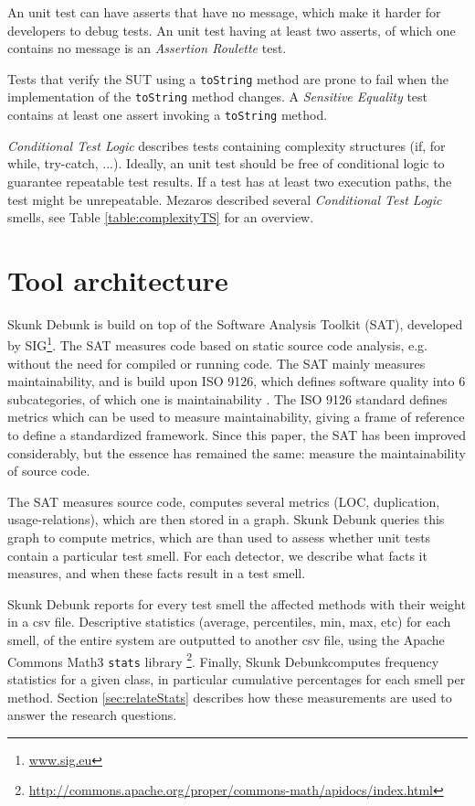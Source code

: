 \documentclass{uvamscse}
\newcommand{\toolName}{Skunk Debunk}
\newcommand{\AtestxUnit}{Mezaros}
\begin{document}
An unit test can have asserts that have no message, which make it harder for developers to debug tests. An unit test having at least two asserts, of which one contains no message is an \emph{Assertion Roulette} test.

Tests that verify the SUT using a \texttt{toString} method are prone to fail when the implementation of the \texttt{toString} method changes. A \emph{Sensitive Equality} test contains at least one assert invoking a \texttt{toString} method.

\emph{Conditional Test Logic} describes tests containing complexity structures (if, for while, try-catch, ...). Ideally, an unit test should be free of conditional logic to guarantee repeatable test results. If a test has at least two execution paths, the test might be unrepeatable. \AtestxUnit{} described several \emph{Conditional Test Logic} smells, see Table \ref{table:complexityTS} for an overview. 

\section{Tool architecture}
\toolName{} is build on top of the Software Analysis Toolkit (SAT), developed by SIG\footnote{\url{www.sig.eu}}. The SAT measures code based on static source code analysis, e.g. without the need for compiled or running code. The SAT mainly measures maintainability, and is build upon ISO 9126, which defines software quality into 6 subcategories, of which one is maintainability \cite{heitlager2007practical}. The ISO 9126 standard defines metrics which can be used to measure maintainability, giving a frame of reference to define a standardized framework. Since this paper, the SAT has been improved considerably, but the essence has remained the same: measure the maintainability of source code. 

The SAT measures source code, computes several metrics (LOC, duplication, usage-relations), which are then stored in a graph. \toolName{} queries this graph to compute metrics, which are than used to assess whether unit tests contain a particular test smell. For each detector, we describe what facts it measures, and when these facts result in a test smell. 

\toolName{} reports for every test smell the affected methods with their weight in a csv file. Descriptive statistics (average, percentiles, min, max, etc) for each smell, of the entire system are outputted to another csv file, using the Apache Commons Math3 \texttt{stats} library \footnote{\url{http://commons.apache.org/proper/commons-math/apidocs/index.html}}. Finally, \toolName computes frequency statistics for a given class, in particular cumulative percentages for each smell per method. Section \ref{sec:relateStats} describes how these measurements are used to answer the research questions.  
\end{document}
